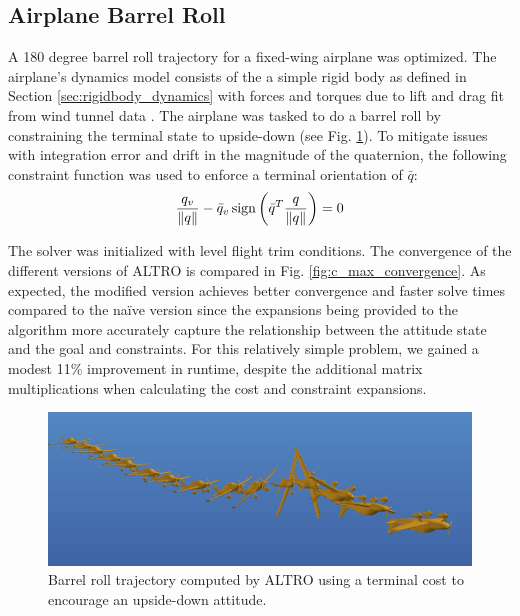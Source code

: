 \documentclass[letterpaper, 10 pt, conference]{ieeeconf}  %
\DeclareMathOperator{\sign}{sign}
\newcommand{\todo}[1]{\textcolor{red}{TODO: #1}}
\begin{document}
    \subsection{Airplane Barrel Roll}

        A 180 degree barrel roll trajectory for a fixed-wing airplane was optimized. The
        airplane's dynamics model consists of the a simple rigid body as defined in
        Section \ref{sec:rigidbody_dynamics} with forces and torques due to lift and drag
        fit from wind tunnel data \cite{manchester2016udp}. The airplane was tasked to do
        a barrel roll by constraining the terminal state to upside-down (see Fig.
        \ref{fig:barrellroll}). To mitigate issues with integration error and drift in the magnitude of the quaternion,
        the following constraint function was used to enforce a terminal orientation of $\bar{q}$:
        \begin{equation}
            \frac{q_v}{\norm{q}} - \bar{q}_v
                \sign\left(\bar{q}^T \frac{q }{ \norm{q}}\right) = 0
        \end{equation}

        The solver was initialized with level flight trim
        conditions. The convergence of the different versions of ALTRO is compared in
        Fig. \ref{fig:c_max_convergence}. As expected, the modified version achieves
        better convergence and faster solve times compared to the na\"ive version since
        the expansions being provided to the algorithm more accurately capture the
        relationship between the attitude state and the goal and constraints. For this 
        relatively simple problem, we gained a modest 11\% improvement in runtime, despite
        the additional matrix multiplications when calculating the cost and constraint
        expansions.

        \begin{figure}[t]
            \centering
            \includegraphics[width=\columnwidth]{figures/barrellroll.png}
            \caption{Barrel roll trajectory computed by ALTRO using a terminal cost to encourage an upside-down attitude.}
            \label{fig:barrellroll}
        \end{figure}
\end{document}
